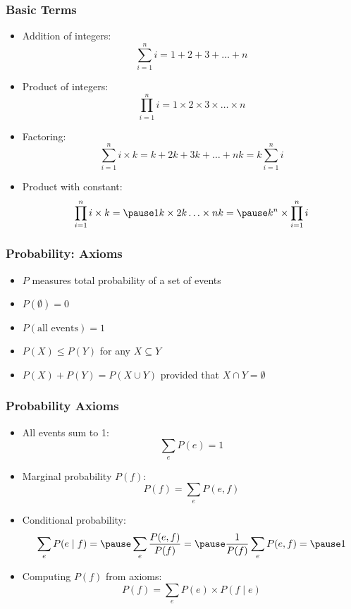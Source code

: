 \begin{frame}
\frametitle{Basic Terms}
\begin{itemize}[<+->]
\item Addition of integers: \[ \sum_{i=1}^n i = 1 + 2 + 3 + \ldots +
  n \]
\item Product of integers: \[ \prod_{i=1}^n i = 1 \times 2 \times 3
  \times \ldots \times n \]
\item Factoring: \[ \sum_{i=1}^n i \times k = k + 2k + 3k + \ldots + nk
  = k \sum_{i=1}^n i \]
\item Product with constant: \[ \prod_{i=1}^n i \times k = \pause 1 k \times 2 k \ldots \times n k = \pause k^n \times \prod_{i=1}^n i \]
\end{itemize}

\end{frame}

\begin{frame}
\frametitle{Probability: Axioms}
\begin{itemize}[<+->]
\item $P$ measures total probability of a set of events
\item $P(\emptyset) = 0$
\item $P(\mbox{all events}) = 1$
\item $P(X) \leq P(Y)$ for any $X \subseteq Y$
\item $P(X) + P(Y) = P(X \cup Y)$ provided that $X \cap Y = \emptyset$
\end{itemize}
\end{frame}

\begin{frame}
\frametitle{Probability Axioms}
\begin{itemize}[<+->]
\item All events sum to 1: \[ \sum_e P(e) = 1 \]
\item Marginal probability $P(f)$: \[ P(f) = \sum_e P(e, f)  \]
\item Conditional probability: \[ \sum_e P(e \mid f) = \pause \sum_e \frac{P(e,f)}{P(f)} = \pause \frac{1}{P(f)} \sum_e P(e,f) = \pause 1 \]
\item Computing $P(f)$ from axioms: \[ P(f) = \sum_e P(e) \times
  P(f \mid e) \]
\end{itemize}

\end{frame}

